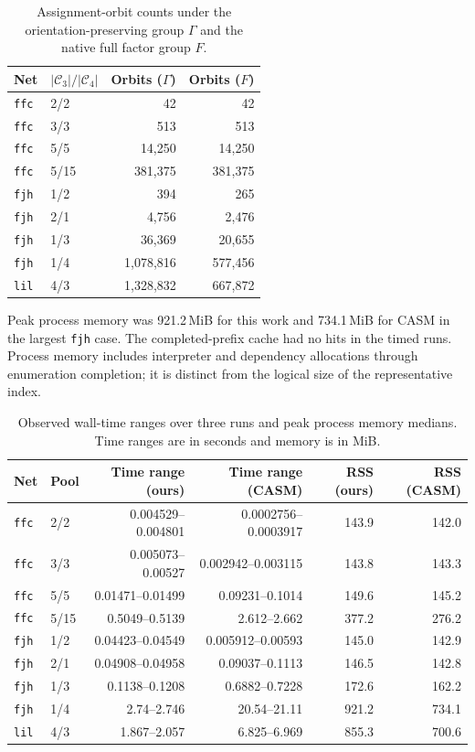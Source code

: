 \documentclass[a5paper, 10pt]{article}
\begin{document}
\begin{table}[H]
\centering\scriptsize
\setlength{\tabcolsep}{1.2mm}
\caption{Assignment-orbit counts under the orientation-preserving group $\Gamma$ and the native full factor group $F$.}
\label{tab:orbit_group_counts}
\begin{tabular}{llrr}
\toprule
Net & $|\mathcal C_3|/|\mathcal C_4|$ & Orbits ($\Gamma$) & Orbits ($F$) \\
\midrule
\texttt{ffc} & 2/2 & 42 & 42 \\
\texttt{ffc} & 3/3 & 513 & 513 \\
\texttt{ffc} & 5/5 & 14,250 & 14,250 \\
\texttt{ffc} & 5/15 & 381,375 & 381,375 \\
\texttt{fjh} & 1/2 & 394 & 265 \\
\texttt{fjh} & 2/1 & 4,756 & 2,476 \\
\texttt{fjh} & 1/3 & 36,369 & 20,655 \\
\texttt{fjh} & 1/4 & 1,078,816 & 577,456 \\
\texttt{lil} & 4/3 & 1,328,832 & 667,872 \\
\bottomrule
\end{tabular}
\end{table}

Peak process memory was 921.2\,MiB for this work and 734.1\,MiB for CASM in the largest \texttt{fjh} case. The completed-prefix cache had no hits in the timed runs. Process memory includes interpreter and dependency allocations through enumeration completion; it is distinct from the logical size of the representative index.

\begin{table}[H]
\centering\scriptsize
\setlength{\tabcolsep}{1.2mm}
\caption{Observed wall-time ranges over three runs and peak process memory medians. Time ranges are in seconds and memory is in MiB.}
\begin{tabular}{llrrrr}
\toprule
Net & Pool & Time range (ours) & Time range (CASM) & RSS (ours) & RSS (CASM) \\
\midrule
\texttt{ffc} & 2/2 & 0.004529--0.004801 & 0.0002756--0.0003917 & 143.9 & 142.0 \\
\texttt{ffc} & 3/3 & 0.005073--0.00527 & 0.002942--0.003115 & 143.8 & 143.3 \\
\texttt{ffc} & 5/5 & 0.01471--0.01499 & 0.09231--0.1014 & 149.6 & 145.2 \\
\texttt{ffc} & 5/15 & 0.5049--0.5139 & 2.612--2.662 & 377.2 & 276.2 \\
\texttt{fjh} & 1/2 & 0.04423--0.04549 & 0.005912--0.00593 & 145.0 & 142.9 \\
\texttt{fjh} & 2/1 & 0.04908--0.04958 & 0.09037--0.1113 & 146.5 & 142.8 \\
\texttt{fjh} & 1/3 & 0.1138--0.1208 & 0.6882--0.7228 & 172.6 & 162.2 \\
\texttt{fjh} & 1/4 & 2.74--2.746 & 20.54--21.11 & 921.2 & 734.1 \\
\texttt{lil} & 4/3 & 1.867--2.057 & 6.825--6.969 & 855.3 & 700.6 \\
\bottomrule
\end{tabular}
\end{table}
\end{document}
